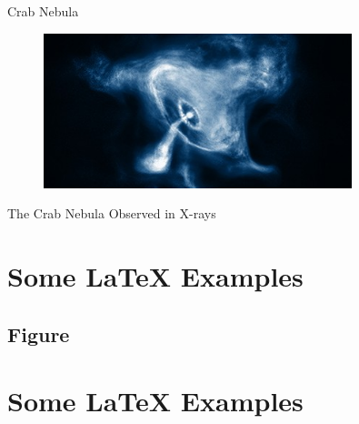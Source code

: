 \documentclass[12pt, aspectratio=169]{beamer}
\begin{document}
\begin{frame}{Crab Nebula}
  

\begin{figure}
\includegraphics[width=0.8\textwidth]{crab_xray.jpg}
\end{figure}
\centering
The Crab Nebula Observed in X-rays

\end{frame}






\section{Some \LaTeX{} Examples}

\subsection{Figure}

\section{Some \LaTeX{} Examples}
\end{document}

